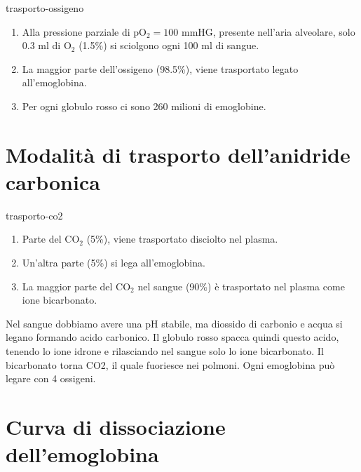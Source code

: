 \documentclass[preview]{standalone}
\begin{document}
\begin{snippet}{trasporto-ossigeno}
    \vspace{-0.5cm}
    \begin{enumerate}
        \item Alla pressione parziale di pO\({}_2=100\) mmHG, presente nell'aria alveolare,
        solo 0.3 ml di O\({}_2\) (1.5\%) si sciolgono ogni 100 ml di sangue.
        \item La maggior parte dell'ossigeno (98.5\%), viene trasportato legato all'emoglobina.
        \item Per ogni globulo rosso ci sono 260 milioni di emoglobine.
    \end{enumerate}
\end{snippet}

\section{Modalità di trasporto dell'anidride carbonica}

\begin{snippet}{trasporto-co2}
    \vspace{-0.5cm}
    \begin{enumerate}
        \item Parte del CO\({}_2\) (5\%), viene trasportato disciolto nel plasma.
        \item Un'altra parte (5\%) si lega all'emoglobina.
        \item La maggior parte del CO\({}_2\) nel sangue (90\%) è trasportato nel plasma come ione bicarbonato. 
    \end{enumerate}
    
    Nel sangue dobbiamo avere una pH stabile, ma diossido di carbonio e acqua
    si legano formando acido carbonico. Il globulo rosso spacca quindi questo acido,
    tenendo lo ione idrone e rilasciando nel sangue solo lo ione bicarbonato.
    Il bicarbonato torna CO2, il quale fuoriesce nei polmoni.
    Ogni emoglobina può legare con 4 ossigeni.
\end{snippet}

\section{Curva di dissociazione dell'emoglobina}

\end{document}

